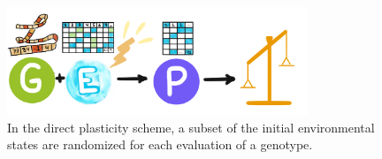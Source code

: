 \begin{figure}
    \includegraphics[width=0.8\textwidth]{img/directscheme}
  \caption{In the direct plasticity scheme, a subset of the initial environmental states are randomized for each evaluation of a genotype.}
  \label{fig:direct_plasticity_scheme}
\end{figure}